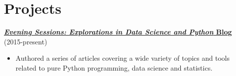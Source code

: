 \documentclass[
]{report}
\providecommand{\tightlist}{%
  \setlength{\itemsep}{0pt}\setlength{\parskip}{0pt}}\usepackage{longtable,booktabs,array}
\begin{document}
\hypertarget{projects}{%
\chapter{Projects}\label{projects}}

\textbf{\href{http://sdsawtelle.github.io/blog/output/index.html}{\emph{Evening
Sessions: Explorations in Data Science and Python} Blog}} (2015-present)

\begin{itemize}
\tightlist
\item
  Authored a series of articles covering a wide variety of topics and
  tools related to pure Python programming, data science and statistics.
\end{itemize}
\end{document}
